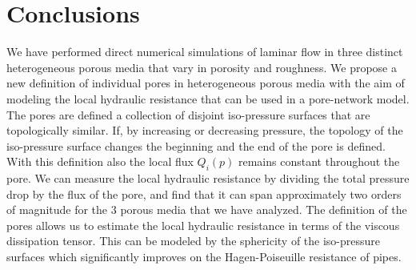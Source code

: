 \documentclass[draft]{agujournal2019}
\begin{document}
\section{Conclusions}
We have performed direct numerical simulations of laminar flow in three distinct heterogeneous porous media that vary in porosity and roughness. We propose a new definition of individual pores in heterogeneous porous media with the aim of modeling the local hydraulic resistance that can be used in a pore-network model. The pores are defined a collection of disjoint iso-pressure surfaces that are topologically similar. If, by increasing or decreasing pressure, the topology of the iso-pressure surface changes the beginning and the end of the pore is defined. With this definition also the local flux $Q_i(p)$ remains constant throughout the pore. We can measure the local hydraulic resistance by dividing the total pressure drop by the flux of the pore, and find that it can span approximately two orders of magnitude for the 3 porous media that we have analyzed. The definition of the pores allows us to estimate the local hydraulic resistance in terms of the viscous dissipation tensor. This can be modeled by the sphericity of the iso-pressure surfaces which significantly improves on the Hagen-Poiseuille resistance of pipes. 









\end{document}
